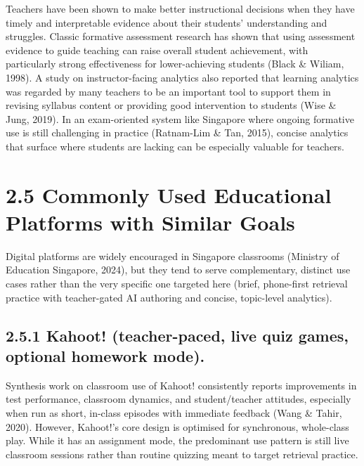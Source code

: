 \documentclass[
  12pt,
  a4paper,
]{report}
\begin{document}
Teachers have been shown to make better instructional decisions when
they have timely and interpretable evidence about their students'
understanding and struggles. Classic formative assessment research has
shown that using assessment evidence to guide teaching can raise overall
student achievement, with particularly strong effectiveness for
lower-achieving students (Black \& Wiliam, 1998). A study on
instructor-facing analytics also reported that learning analytics was
regarded by many teachers to be an important tool to support them in
revising syllabus content or providing good intervention to students
(Wise \& Jung, 2019). In an exam-oriented system like Singapore where
ongoing formative use is still challenging in practice (Ratnam-Lim \& Tan,
2015), concise analytics that surface where students are lacking can be
especially valuable for teachers.

\hypertarget{commonly-used-educational-platforms-with-similar-goals}{%
\section{2.5 Commonly Used Educational Platforms with Similar
Goals}\label{commonly-used-educational-platforms-with-similar-goals}}

Digital platforms are widely encouraged in Singapore classrooms
(Ministry of Education Singapore, 2024), but they tend to serve
complementary, distinct use cases rather than the very specific one
targeted here (brief, phone-first retrieval practice with teacher-gated
AI authoring and concise, topic-level analytics).

\hypertarget{kahoot-teacher-paced-live-quiz-games-optional-homework-mode.}{%
\subsection{2.5.1 Kahoot! (teacher-paced, live quiz games, optional
homework
mode).}\label{kahoot-teacher-paced-live-quiz-games-optional-homework-mode.}}

Synthesis work on classroom use of Kahoot! consistently reports
improvements in test performance, classroom dynamics, and
student/teacher attitudes, especially when run as short, in-class
episodes with immediate feedback  (Wang \& Tahir, 2020). However, Kahoot!'s
core design is optimised for synchronous, whole-class play. While it has
an assignment mode, the predominant use pattern is still live classroom
sessions rather than routine quizzing meant to target retrieval
practice.
\end{document}

